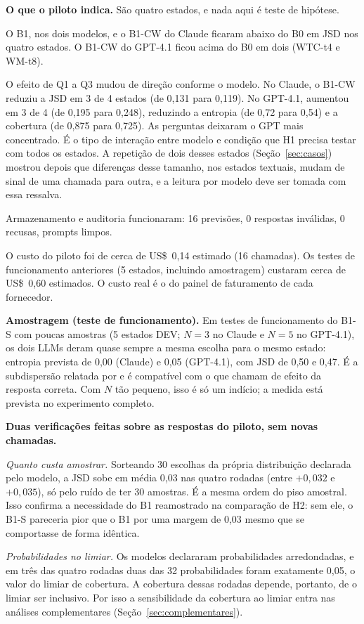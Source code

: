 \documentclass[12pt,oneside,a4paper,chapter=TITLE,english,brazil]{abntex2}
\begin{document}
\begin{real}
\textbf{O que o piloto indica.} São quatro estados, e nada aqui é teste de hipótese.

O B1, nos dois modelos, e o B1-CW do Claude ficaram abaixo do B0 em JSD nos quatro estados. O B1-CW do GPT-4.1 ficou acima do B0 em dois (WTC-t4 e WM-t8).

O efeito de Q1 a Q3 mudou de direção conforme o modelo. No Claude, o B1-CW reduziu a JSD em 3 de 4 estados (de 0,131 para 0,119). No GPT-4.1, aumentou em 3 de 4 (de 0,195 para 0,248), reduzindo a entropia (de 0,72 para 0,54) e a cobertura (de 0,875 para 0,725). As perguntas deixaram o GPT mais concentrado. É o tipo de interação entre modelo e condição que H1 precisa testar com todos os estados. A repetição de dois desses estados (Seção~\ref{sec:casos}) mostrou depois que diferenças desse tamanho, nos estados textuais, mudam de sinal de uma chamada para outra, e a leitura por modelo deve ser tomada com essa ressalva.

Armazenamento e auditoria funcionaram: 16 previsões, 0 respostas inválidas, 0 recusas, prompts limpos.

O custo do piloto foi de cerca de US\$~0,14 estimado (16 chamadas). Os testes de funcionamento anteriores (5 estados, incluindo amostragem) custaram cerca de US\$~0,60 estimados. O custo real é o do painel de faturamento de cada fornecedor.
\end{real}

\begin{real}
\textbf{Amostragem (teste de funcionamento).} Em testes de funcionamento do B1-S com poucas amostras (5 estados DEV; $N=3$ no Claude e $N=5$ no GPT-4.1), os dois LLMs deram quase sempre a mesma escolha para o mesmo estado: entropia prevista de 0,00 (Claude) e 0,05 (GPT-4.1), com JSD de 0,50 e 0,47. É a subdispersão relatada por  e é compatível com o que  chamam de efeito da resposta correta. Com $N$ tão pequeno, isso é só um indício; a medida está prevista no experimento completo.
\end{real}

\begin{real}
\textbf{Duas verificações feitas sobre as respostas do piloto, sem novas chamadas.}

\textit{Quanto custa amostrar.} Sorteando 30 escolhas da própria distribuição declarada pelo modelo, a JSD sobe em média 0,03 nas quatro rodadas (entre $+0{,}032$ e $+0{,}035$), só pelo ruído de ter 30 amostras. É a mesma ordem do piso amostral. Isso confirma a necessidade do B1 reamostrado na comparação de H2: sem ele, o B1-S pareceria pior que o B1 por uma margem de 0,03 mesmo que se comportasse de forma idêntica.

\textit{Probabilidades no limiar.} Os modelos declararam probabilidades arredondadas, e em três das quatro rodadas duas das 32 probabilidades foram exatamente 0,05, o valor do limiar de cobertura. A cobertura dessas rodadas depende, portanto, de o limiar ser inclusivo. Por isso a sensibilidade da cobertura ao limiar entra nas análises complementares (Seção~\ref{sec:complementares}).
\end{real}
\end{document}
